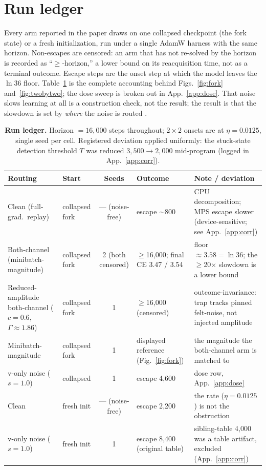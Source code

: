 \documentclass[10pt]{article}
\newcommand{\gam}{\Gamma}
\begin{document}
\small





\normalsize


\appendix

\section{Run ledger}
\label{app:ledger}
Every arm reported in the paper draws on one collapsed checkpoint (the fork
state) or a fresh initialization, run under a single AdamW harness with the same
horizon. Non-escapes are censored: an arm that has not re-solved by the horizon
is recorded as ``$\ge$-horizon,'' a lower bound on its reacquisition time, not
as a terminal outcome. Escape steps are the onset step at which the model leaves
the $\ln 36$ floor. Table~\ref{tab:ledger} is the complete accounting behind
Figs.~\ref{fig:fork} and~\ref{fig:twobytwo}; the dose sweep is broken out in
App.~\ref{app:dose}. That noise slows learning at all is a construction check,
not the result; the result is that the slowdown is set by \emph{where} the noise
is routed \citep{position}.

\begin{table}[h]
\centering
\footnotesize
\setlength{\tabcolsep}{4pt}
\begin{tabular}{@{}p{2.5cm} p{1.7cm} c p{2.4cm} p{3.5cm}@{}}
\toprule
Routing & Start & Seeds & Outcome & Note / deviation \\
\midrule
Clean (full-grad.\ replay) & collapsed fork & --- (noise-free) & escape $\sim$800 & CPU decomposition; MPS escape slower (device-sensitive; see App.~\ref{app:corr}) \\
Both-channel (minibatch-magnitude) & collapsed fork & 2 (both censored) & $\ge$16{,}000; final CE 3.47 / 3.54 & floor $\approx 3.58=\ln 36$; the $\ge$20$\times$ slowdown is a lower bound \\
Reduced-amplitude both-channel ($c{=}0.6$, $\gam{\approx}1.86$) & collapsed fork & 1 & $\ge$16{,}000 (censored) & outcome-invariance: trap tracks pinned felt-noise, not injected amplitude \\
Minibatch-magnitude & collapsed fork & 1 & displayed reference (Fig.~\ref{fig:fork}) & the magnitude the both-channel arm is matched to \\
v-only noise ($s{=}1.0$) & collapsed & 1 & escape 4{,}600 & dose row, App.~\ref{app:dose} \\
Clean & fresh init & --- (noise-free) & escape 2{,}200 & the rate ($\eta{=}0.0125$) is not the obstruction \\
v-only noise ($s{=}1.0$) & fresh init & 1 & escape 8{,}400 (original table) & sibling-table 4{,}000 was a table artifact, excluded (App.~\ref{app:corr}) \\
\bottomrule
\end{tabular}
\caption{\textbf{Run ledger.} Horizon $=16{,}000$ steps throughout; $2\times2$
onsets are at $\eta=0.0125$, single seed per cell. Registered deviation applied
uniformly: the stuck-state detection threshold $T$ was reduced $3{,}500\to2{,}000$
mid-program (logged in App.~\ref{app:corr}).}
\label{tab:ledger}
\end{table}
\end{document}
